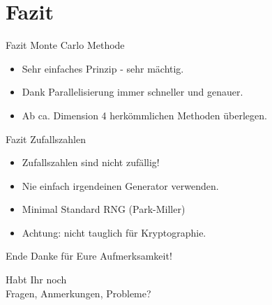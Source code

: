 \documentclass{beamer}
\begin{document}
\section{Fazit}
\begin{frame}{Fazit Monte Carlo Methode}
	\begin{itemize}
		\item Sehr einfaches Prinzip - sehr mächtig.
		\item Dank Parallelisierung immer schneller und genauer.
		\item Ab ca. Dimension 4 herkömmlichen Methoden überlegen.
	\end{itemize}
\end{frame}
\begin{frame}{Fazit Zufallszahlen}
	\begin{itemize}
		\item Zufallszahlen sind nicht zufällig!
		\item Nie einfach irgendeinen Generator verwenden.
		\item Minimal Standard RNG (Park-Miller)
		\item Achtung: nicht tauglich für Kryptographie.
	\end{itemize}
\end{frame}
\begin{frame}{Ende}
	\centering
	Danke für Eure Aufmerksamkeit! \\
	
	\vspace{1cm}
	
	Habt Ihr noch \\
	Fragen, Anmerkungen, Probleme?
\end{frame}
\end{document}
